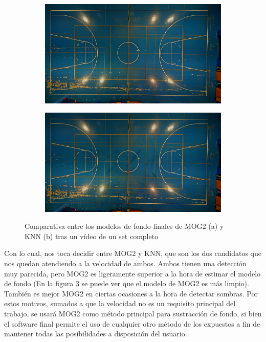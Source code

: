 \begin{figure}
\begin{subfigure}{.5\textwidth}
  \centering
  \includegraphics[width=.9\linewidth]{images/modeloMOG}
  \caption { }
  \label{fig:modelos1a}
\end{subfigure}%
\begin{subfigure}{.5\textwidth}
  \centering
  \includegraphics[width=.9\linewidth]{images/modeloKNN}
  \caption { }
  \label{fig:modelos1b}
\end{subfigure}
\caption{Comparativa entre los modelos de fondo finales de MOG2 (a) y KNN (b) tras un vídeo de un set completo }
\label{fig:modelos}
\end{figure}

Con lo cual, nos toca decidir entre MOG2 y KNN, que son los dos candidatos que nos quedan atendiendo a la velocidad de ambos. Ambos tienen una detección muy parecida, pero MOG2 es ligeramente superior a la hora de estimar el modelo de fondo (En la figura \ref{fig:modelos} se puede ver que el modelo de MOG2 es más limpio). También es mejor MOG2 en ciertas ocasiones a la hora de detectar sombras. Por estos motivos, sumados a que la velocidad no es un requisito principal del trabajo, se usará MOG2 como método principal para sustracción de fondo, si bien el software final permite el uso de cualquier otro método de los expuestos a fin de mantener todas las posibilidades a disposición del usuario.

